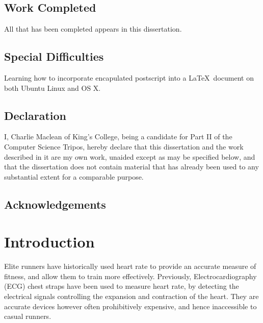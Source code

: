 \documentclass[12pt,a4paper,twoside,openright]{report}
\begin{document}
\section*{Work Completed}

All that has been completed appears in this dissertation.

\section*{Special Difficulties}

Learning how to incorporate encapulated postscript into a \LaTeX\
document on both Ubuntu Linux and OS X.
 
\newpage
\section*{Declaration}

I, Charlie Maclean of King's College, being a candidate for Part II of the 
Computer Science Tripos, hereby declare that this dissertation and the work 
described in it are my own work, unaided except as may be specified below, 
and that the dissertation does not contain material that has already been 
used to any substantial extent for a comparable purpose.

\bigskip
{}

\medskip
{}

\tableofcontents

\listoffigures

\newpage
\section*{Acknowledgements}



\pagestyle{headings}

\chapter{Introduction}

Elite runners have historically used heart rate to provide an accurate 
measure of fitness, and allow them to train more effectively. 
Previously, Electrocardiography (ECG) chest straps have been 
used to measure heart rate, by detecting the electrical signals controlling 
the expansion and contraction of the heart. They are accurate devices however
often prohibitively expensive, and hence inaccessible to casual runners.
\end{document}
